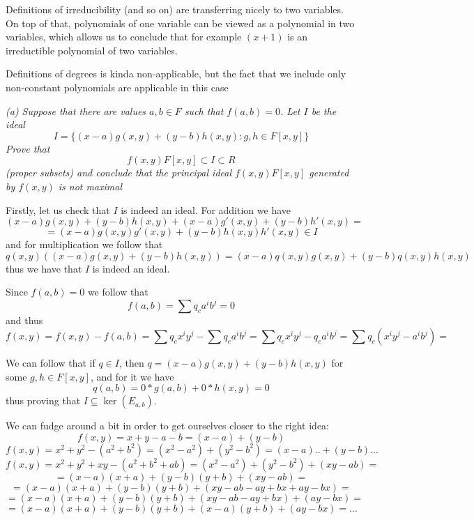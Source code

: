 \documentclass[11pt,oneside,titlepage]{book}
\newcommand{\set}[1]{\{ #1 \}}
\begin{document}
Definitions of irreducibility (and so on) are transferring nicely to
two variables. On top of that, polynomials of one variable can be
viewed as a polynomial in two variables, which allows us to conclude
that for example $(x + 1)$ is an irreductible polynomial of two
variables.

Definitions of degrees is kinda non-applicable, but the fact that we
include only non-constant polynomials are applicable in this case

\textit{(a) Suppose that there are values $a, b \in F$ such that $f(a,
b) = 0$. Let $I$ be the ideal
  $$I = \set{(x - a) g(x, y) + (y - b) h(x, y): g, h \in F[x, y]}$$
  Prove that
  $$f(x, y)F[x, y] \subset I \subset R$$
  (proper subsets) and conclude that the principal ideal $f(x, y)F[x,
y]$ generated by $f(x, y)$ is not maximal }


Firstly, let us check that $I$ is indeed an ideal. For addition we
have
$$(x - a)g(x, y) + (y - b)h(x, y) + (x - a)g'(x, y) + (y - b)h'(x, y) = $$
$$= (x - a)g(x, y)g'(x, y) + (y - b)h(x, y)h'(x, y) \in I$$
and for multiplication we follow that
$$q(x, y) ((x - a)g(x, y) + (y - b)h(x, y)) =
(x - a)q(x, y)g(x, y) + (y - b)q(x, y)h(x, y)$$ thus we have that $I$
is indeed an ideal.

Since $f(a, b) = 0$ we follow that
$$f(a, b) = \sum{q_c a^i b^j} = 0$$
and thus
$$f(x, y) = f(x, y) - f(a, b) = \sum{q_c x^i y^j} - \sum{q_c a^i b^j} =
\sum{q_c x^i y^j - q_c a^i b^j} = \sum{q_c (x^i y^j - a^i b^j)} = $$

We can follow that if $q \in I$, then $q = (x - a)g(x, y) + (y -
b)h(x, y)$ for some $g, h \in F[x, y]$, and for it we have
$$q(a, b) = 0 * g(a, b) + 0 * h(x, y) = 0$$
thus proving that $I \subseteq \ker(E_{a, b})$.

We can fudge around a bit in order to get ourselves closer to the
right idea:
$$f(x, y) = x + y - a - b = (x - a) + (y - b)$$
$$f(x, y) = x^2 + y^2 - (a^2 + b^2) = (x^2 - a^2) + (y^2 - b^2) = (x - a) .. + (y - b) ...$$
$$f(x, y) = x^2 + y^2 + xy - (a^2 + b^2 + ab) = (x^2 - a^2) + (y^2 - b^2) + (xy - ab) =$$
$$= 
(x - a)(x + a) + (y - b)(y + b) + (xy - ab) = $$
$$ = (x - a)(x + a) + (y -
b)(y + b) + (xy - ab - ay + bx + ay - bx) = $$
$$ = (x - a)(x + a) + (y - b)(y
+ b) + (xy - ab - ay + bx) + (ay - bx) = $$
$$ =
(x - a)(x + a) + (y - b)(y + b) + (x - a) (y + b) + (ay - bx) = ...$$
\end{document}
